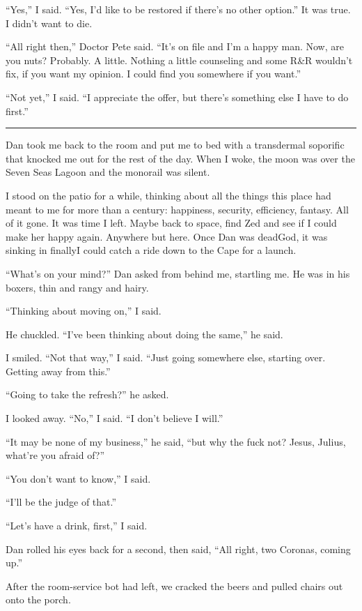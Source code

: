 “Yes,” I said. “Yes, I'd like to be restored if there's no other
option.” It was true. I didn't want to die.

“All right then,” Doctor Pete said. “It's on file and I'm a happy
man. Now, are you nuts? Probably. A little. Nothing a little
counseling and some R\&R wouldn't fix, if you want my opinion. I
could find you somewhere if you want.”

“Not yet,” I said. “I appreciate the offer, but there's something
else I have to do first.”

\begin{center}\rule{3in}{0.4pt}\end{center}

Dan took me back to the room and put me to bed with a transdermal
soporific that knocked me out for the rest of the day. When I woke,
the moon was over the Seven Seas Lagoon and the monorail was
silent.

I stood on the patio for a while, thinking about all the things
this place had meant to me for more than a century: happiness,
security, efficiency, fantasy. All of it gone. It was time I left.
Maybe back to space, find Zed and see if I could make her happy
again. Anywhere but here. Once Dan was dead{\dash}God, it was sinking in
finally{\dash}I could catch a ride down to the Cape for a launch.

“What's on your mind?” Dan asked from behind me, startling me. He
was in his boxers, thin and rangy and hairy.

“Thinking about moving on,” I said.

He chuckled. “I've been thinking about doing the same,” he said.

I smiled. “Not that way,” I said. “Just going somewhere else,
starting over. Getting away from this.”

“Going to take the refresh?” he asked.

I looked away. “No,” I said. “I don't believe I will.”

“It may be none of my business,” he said, “but why the fuck not?
Jesus, Julius, what're you afraid of?”

“You don't want to know,” I said.

“I'll be the judge of that.”

“Let's have a drink, first,” I said.

Dan rolled his eyes back for a second, then said, “All right, two
Coronas, coming up.”

After the room-service bot had left, we cracked the beers and
pulled chairs out onto the porch.

